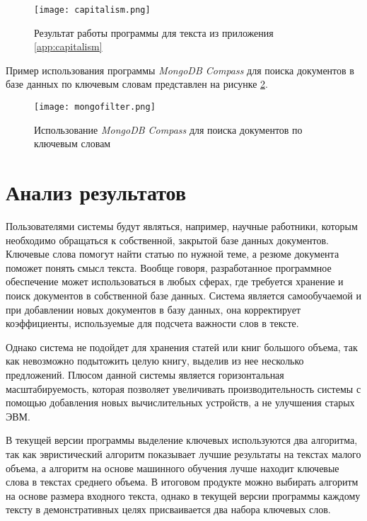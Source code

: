 \begin{figure}[H]
\centering
\texttt{[image: capitalism.png]}
\caption{Результат работы программы для текста из приложения \hyperref[app:capitalism]{\ref{app:capitalism}}}
\label{fig:res_capitalism}
\end{figure}

Пример использования программы \textit{MongoDB Compass} для поиска документов в базе данных по ключевым словам представлен на рисунке \hyperref[fig:mongo_capitalism]{\ref{fig:mongo_capitalism}}.

\begin{figure}[H]
\centering
\texttt{[image: mongofilter.png]}
\caption{Использование \textit{MongoDB Compass} для поиска документов по ключевым словам}
\label{fig:mongo_capitalism}
\end{figure}

\section{Анализ результатов}

Пользователями системы будут являться, например, научные работники, которым необходимо обращаться к собственной, закрытой базе данных документов. Ключевые слова помогут найти статью по нужной теме, а резюме документа поможет понять смысл текста. Вообще говоря, разработанное программное обеспечение может использоваться в любых сферах, где требуется хранение и поиск документов в собственной базе данных. Система является самообучаемой и при добавлении новых документов в базу данных, она корректирует коэффициенты, используемые для подсчета важности слов в тексте.

Однако система не подойдет для хранения статей или книг большого объема, так как невозможно подытожить целую книгу, выделив из нее несколько предложений. Плюсом данной системы является горизонтальная масштабируемость, которая позволяет увеличивать производительность системы с помощью добавления новых вычислительных устройств, а не улучшения старых ЭВМ.

В текущей версии программы выделение ключевых используются два алгоритма, так как эвристический алгоритм показывает лучшие результаты на текстах малого объема, а алгоритм на основе машинного обучения лучше находит ключевые слова в текстах среднего объема. В итоговом продукте можно выбирать алгоритм на основе размера входного текста, однако в текущей версии программы каждому тексту в демонстративных целях присваивается два набора ключевых слов.

